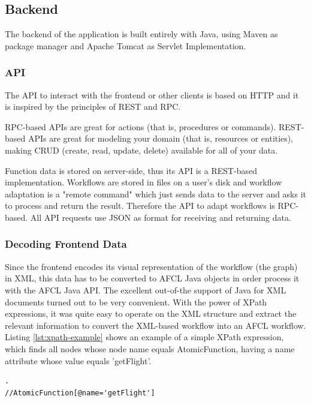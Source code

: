 \documentclass[a4paper,top=25mm,bottom=25mm,12pt,pdftex,halfparskip,twoside,bibtotoc,numbers=noenddot]{scrbook}
\begin{document}
\subsection{Backend}

The backend  of the application is built entirely with Java, using Maven as package manager and Apache Tomcat as Servlet Implementation.

\subsubsection{API}
 
The API to interact with the frontend or other clients is based on HTTP and it is inspired by the principles of REST and RPC.

RPC-based APIs are great for actions (that is, procedures or commands).
REST-based APIs are great for modeling your domain (that is, resources or entities), making CRUD (create, read, update, delete) available for all of your data. \cite{online-smashingmagazine-rest-vs-rpc}

Function data is stored on server-side, thus its API is a REST-based implementation. Workflows are stored in files on a user's disk and workflow adaptation is a "remote command" which just sends data to the server and asks it to process and return the result. Therefore the API to adapt workflows is RPC-based. All API requests use JSON as format for receiving and returning data.

\subsubsection{Decoding Frontend Data}
\label{sec:backend-decoding}

Since the frontend encodes its visual representation of the workflow (the graph) in XML, this data has to be converted to AFCL Java objects in order process it with the AFCL Java API.
The excellent out-of-the support of Java for XML documents turned out to be very convenient. With the power of XPath expressions, it was quite easy to operate on the XML structure and extract the relevant information to convert the XML-based workflow into an AFCL workflow. Listing \ref{lst:xpath-example} shows an example of a simple XPath expression, which finds all nodes whose node name equals \textsf{AtomicFunction}, having a \textsf{name} attribute whose value equals 'getFlight'.\\

\begin{lstlisting}[caption={Example of an XPath expression.},label={lst:xpath-example}].
//AtomicFunction[@name='getFlight']
\end{lstlisting}
\end{document}
